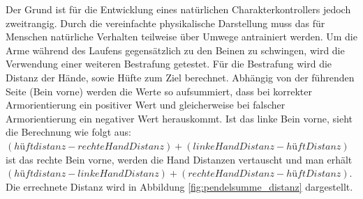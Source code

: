 Der Grund ist für die Entwicklung eines natürlichen Charakterkontrollers jedoch zweitrangig. Durch die vereinfachte physikalische Darstellung muss das für Menschen natürliche Verhalten teilweise über Umwege antrainiert werden. Um die Arme während des Laufens gegensätzlich zu den Beinen zu schwingen, wird die Verwendung einer weiteren Bestrafung getestet. Für die Bestrafung wird die Distanz der Hände, sowie Hüfte zum Ziel berechnet. Abhängig von der führenden Seite (Bein vorne) werden die Werte so aufsummiert, dass bei korrekter Armorientierung ein positiver Wert und gleicherweise bei falscher Armorientierung ein negativer Wert herauskommt. Ist das linke Bein vorne, sieht die Berechnung wie folgt aus: $(hüftdistanz - rechteHandDistanz) + (linkeHandDistanz - hüftDistanz)$ ist das rechte Bein vorne, werden die Hand Distanzen vertauscht und man erhält $(hüftdistanz - linkeHandDistanz) + (rechteHandDistanz - hüftDistanz)$. Die errechnete Distanz wird in Abbildung \ref{fig:pendelsumme_distanz} dargestellt.


